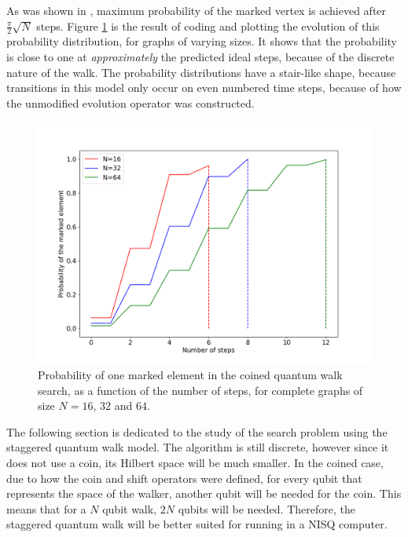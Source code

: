 \documentclass[../../dissertation.tex]{subfiles}
\begin{document}
As was shown in \cite{REN1}, maximum probability of the marked vertex is
achieved after $\frac{\pi}{2}\sqrt{N}$ steps. Figure \ref{fig:coinedSearch} is
the result of coding and plotting the evolution of this probability
distribution, for graphs of varying sizes. It shows that the probability is
close to one at \textit{approximately} the predicted ideal steps, because of
the discrete nature of the walk. The probability distributions have a
stair-like shape, because transitions in this model only occur on even numbered
time steps, because of how the unmodified evolution
operator was constructed.
\begin{figure}[!h]
	\centering
	\includegraphics[scale=0.40]{img/CoinedQuantumWalk/Search/CoinedSearch163264.png}
	\caption{Probability of one marked element in the coined quantum walk search, as a function of the number of steps, for complete graphs of size $N=16$, $32$ and $64$.}\label{fig:coinedSearch}
\end{figure}\par
The following section is dedicated to the study of the search problem using the
staggered quantum walk model. The algorithm is still discrete, however since it
does not use a coin, its Hilbert space will be much smaller. In the coined
case, due to how the coin and shift operators were defined, for every qubit
that represents the space of the walker, another qubit will be needed for the
coin. This means that for a $N$ qubit walk, $2N$ qubits will be needed.
Therefore, the staggered quantum walk will be better suited for running in a
NISQ computer.
\end{document}
